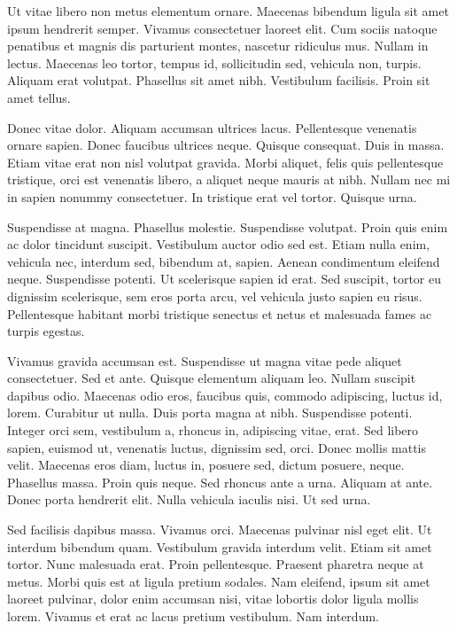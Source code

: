 \documentclass{book}
\begin{document}
Ut vitae libero non metus elementum ornare. Maecenas bibendum ligula sit amet ipsum hendrerit semper. Vivamus consectetuer laoreet elit. Cum sociis natoque penatibus et magnis dis parturient montes, nascetur ridiculus mus. Nullam in lectus. Maecenas leo tortor, tempus id, sollicitudin sed, vehicula non, turpis. Aliquam erat volutpat. Phasellus sit amet nibh. Vestibulum facilisis. Proin sit amet tellus.

Donec vitae dolor. Aliquam accumsan ultrices lacus. Pellentesque venenatis ornare sapien. Donec faucibus ultrices neque. Quisque consequat. Duis in massa. Etiam vitae erat non nisl volutpat gravida. Morbi aliquet, felis quis pellentesque tristique, orci est venenatis libero, a aliquet neque mauris at nibh. Nullam nec mi in sapien nonummy consectetuer. In tristique erat vel tortor. Quisque urna.

Suspendisse at magna. Phasellus molestie. Suspendisse volutpat. Proin quis enim ac dolor tincidunt suscipit. Vestibulum auctor odio sed est. Etiam nulla enim, vehicula nec, interdum sed, bibendum at, sapien. Aenean condimentum eleifend neque. Suspendisse potenti. Ut scelerisque sapien id erat. Sed suscipit, tortor eu dignissim scelerisque, sem eros porta arcu, vel vehicula justo sapien eu risus. Pellentesque habitant morbi tristique senectus et netus et malesuada fames ac turpis egestas.

Vivamus gravida accumsan est. Suspendisse ut magna vitae pede aliquet consectetuer. Sed et ante. Quisque elementum aliquam leo. Nullam suscipit dapibus odio. Maecenas odio eros, faucibus quis, commodo adipiscing, luctus id, lorem. Curabitur ut nulla. Duis porta magna at nibh. Suspendisse potenti. Integer orci sem, vestibulum a, rhoncus in, adipiscing vitae, erat. Sed libero sapien, euismod ut, venenatis luctus, dignissim sed, orci. Donec mollis mattis velit. Maecenas eros diam, luctus in, posuere sed, dictum posuere, neque. Phasellus massa. Proin quis neque. Sed rhoncus ante a urna. Aliquam at ante. Donec porta hendrerit elit. Nulla vehicula iaculis nisi. Ut sed urna.

Sed facilisis dapibus massa. Vivamus orci. Maecenas pulvinar nisl eget elit. Ut interdum bibendum quam. Vestibulum gravida interdum velit. Etiam sit amet tortor. Nunc malesuada erat. Proin pellentesque. Praesent pharetra neque at metus. Morbi quis est at ligula pretium sodales. Nam eleifend, ipsum sit amet laoreet pulvinar, dolor enim accumsan nisi, vitae lobortis dolor ligula mollis lorem. Vivamus et erat ac lacus pretium vestibulum. Nam interdum.
\end{document}
